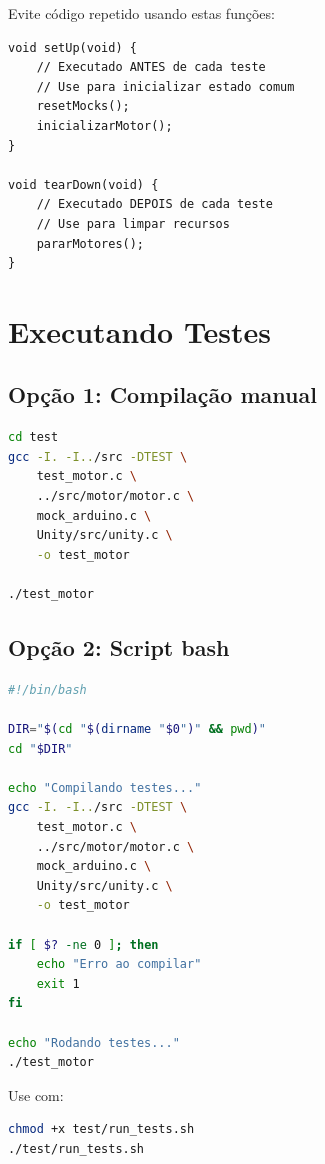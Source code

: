 \documentclass[12pt,a4paper]{article}
\begin{document}
Evite código repetido usando estas funções:

\begin{lstlisting}[caption=setUp e tearDown]
void setUp(void) {
    // Executado ANTES de cada teste
    // Use para inicializar estado comum
    resetMocks();
    inicializarMotor();
}

void tearDown(void) {
    // Executado DEPOIS de cada teste
    // Use para limpar recursos
    pararMotores();
}
\end{lstlisting}

\section{Executando Testes}

\subsection{Opção 1: Compilação manual}

\begin{lstlisting}[language=bash, caption=Compilar manualmente]
cd test
gcc -I. -I../src -DTEST \
    test_motor.c \
    ../src/motor/motor.c \
    mock_arduino.c \
    Unity/src/unity.c \
    -o test_motor

./test_motor
\end{lstlisting}

\subsection{Opção 2: Script bash}

\begin{lstlisting}[language=bash, caption=run\_tests.sh - Automatizar testes]
#!/bin/bash

DIR="$(cd "$(dirname "$0")" && pwd)"
cd "$DIR"

echo "Compilando testes..."
gcc -I. -I../src -DTEST \
    test_motor.c \
    ../src/motor/motor.c \
    mock_arduino.c \
    Unity/src/unity.c \
    -o test_motor

if [ $? -ne 0 ]; then
    echo "Erro ao compilar"
    exit 1
fi

echo "Rodando testes..."
./test_motor
\end{lstlisting}

Use com:
\begin{lstlisting}[language=bash]
chmod +x test/run_tests.sh
./test/run_tests.sh
\end{lstlisting}
\end{document}
